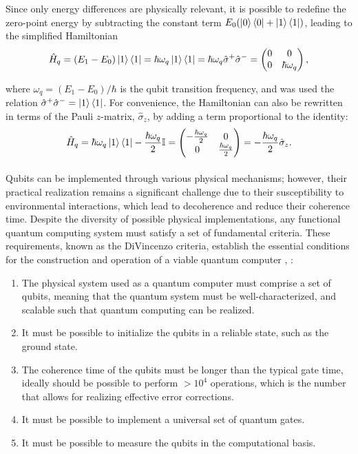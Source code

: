 Since only energy differences are physically relevant, it is possible to redefine the zero-point energy by subtracting the constant term $E_0 (\ket{0} \bra{0} + \ket{1} \bra{1})$, leading to the simplified Hamiltonian
\begin{equation}\label{eq:qubithamiltonian}
    \hat{H}_q = (E_1 - E_0) \ket{1} \bra{1} = \hbar \omega_q \ket{1} \bra{1} = \hbar \omega_q \hat{\sigma}^{+} \hat{\sigma}^{-} = 
    \begin{pmatrix}
        0 & 0 \\
        0 & \hbar \omega_q
    \end{pmatrix},
\end{equation}

where $\omega_q = (E_1 - E_0)/\hbar$ is the qubit transition frequency, and was used the relation $\hat{\sigma}^{+} \hat{\sigma}^{-} = \ket{1} \bra{1}$.
For convenience, the Hamiltonian can also be rewritten in terms of the Pauli $z$-matrix, $\hat{\sigma}_z$, by adding a term proportional to the identity:
\begin{equation}
    \hat{H}_q = \hbar \omega_q \ket{1} \bra{1} - \frac{\hbar \omega_q}{2}\mathbb{I} = 
    \begin{pmatrix}
        -\frac{\hbar \omega_q}{2} & 0 \\
        0 & \frac{\hbar \omega_q}{2}
    \end{pmatrix} = -\frac{\hbar \omega_q}{2} \hat{\sigma}_z.
\end{equation}

\paragraph{}
Qubits can be implemented through various physical mechanisms; however, their practical realization remains a significant challenge due to their susceptibility to environmental interactions, which lead to decoherence and reduce their coherence time. 
Despite the diversity of possible physical implementations, any functional quantum computing system must satisfy a set of fundamental criteria. 
These requirements, known as the DiVincenzo criteria, establish the essential conditions for the construction and operation of a viable quantum computer \cite{DiVincenzo_2000}, \cite{manenti_quantum_2023}:
\begin{enumerate}
    \item The physical system used as a quantum computer must comprise a set of qubits, meaning that the quantum system must be well-characterized, and scalable such that quantum
    computing can be realized.
    \item It must be possible to initialize the qubits in a reliable state, such as the ground state.
    \item The coherence time of the qubits must be longer than the typical gate time, ideally should be possible to perform $>10^4$ operations, which is the number that allows for realizing effective error corrections.
    \item It must be possible to implement a universal set of quantum gates.
    \item It must be possible to measure the qubits in the computational basis.
\end{enumerate}

